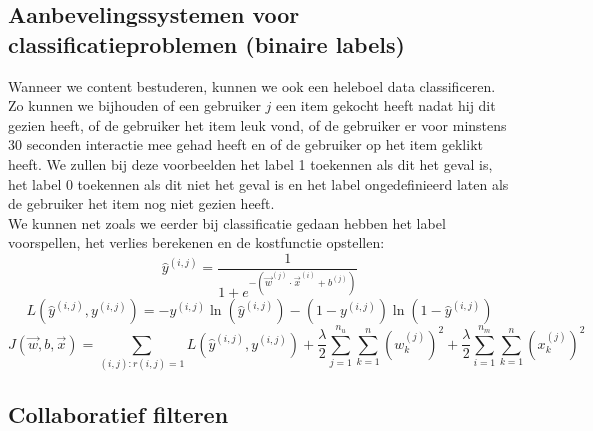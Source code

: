\subsection{Aanbevelingssystemen voor classificatieproblemen (binaire labels)}

Wanneer we content bestuderen, kunnen we ook een heleboel data classificeren. Zo kunnen we bijhouden of een gebruiker $j$ een item gekocht heeft nadat hij dit gezien heeft, of de gebruiker het item leuk vond, of de gebruiker er voor minstens 30 seconden interactie mee gehad heeft en of de gebruiker op het item geklikt heeft. We zullen bij deze voorbeelden het label 1 toekennen als dit het geval is, het label 0 toekennen als dit niet het geval is en het label ongedefinieerd laten als de gebruiker het item nog niet gezien heeft. \\
\newline
We kunnen net zoals we eerder bij classificatie gedaan hebben het label voorspellen, het verlies berekenen en de kostfunctie opstellen:
\begin{equation}
	\hat{y}^{(i, j)} = \frac{1}{1 + e^{-(\vec{w}^{(j)} \cdot \vec{x}^{(i)} + b^{(j)})}}
\end{equation}
\begin{equation}
	L(\hat{y}^{(i, j)}, y^{(i, j)}) = -y^{(i, j)} \ln(\hat{y}^{(i, j)}) - (1 - y^{(i, j)}) \ln(1 - \hat{y}^{(i, j)}) 
\end{equation}
\begin{equation}
	J(\vec{w}, b, \vec{x}) = \sum_{(i, j):r(i, j) = 1} L(\hat{y}^{(i, j)}, y^{(i, j)})
	+ \frac{\lambda}{2} \sum_{j=1}^{n_{u}} \sum_{k=1}^{n}(w_{k}^{(j)})^{2}
	+ \frac{\lambda}{2} \sum_{i=1}^{n_{m}} \sum_{k=1}^{n}(x_{k}^{(j)})^{2}
\end{equation}

\subsection{Collaboratief filteren}

